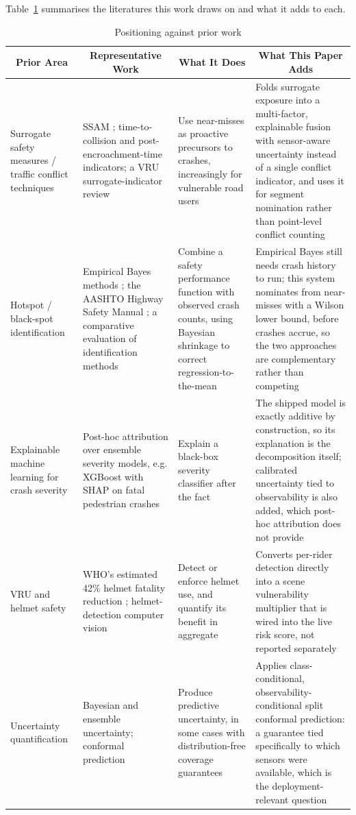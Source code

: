 \documentclass[journal]{IEEEtran}
\begin{document}
Table~\ref{tab:related} summarises the literatures this work draws on and what it adds to each.

\begin{table}[!t]
\centering
\caption{Positioning against prior work}
\label{tab:related}
\footnotesize
\setlength{\tabcolsep}{4pt}
\begin{tabular}{p{2.3cm}p{3.6cm}p{4.3cm}p{4.3cm}}
\toprule
\multicolumn{1}{c}{\textbf{Prior Area}} & \multicolumn{1}{c}{\textbf{Representative Work}} & \multicolumn{1}{c}{\textbf{What It Does}} & \multicolumn{1}{c}{\textbf{What This Paper Adds}} \\
\midrule
Surrogate safety measures / traffic conflict techniques & SSAM \cite{gettman2008}; time-to-collision and post-encroachment-time indicators; a VRU surrogate-indicator review \cite{johnsson2018} & Use near-misses as proactive precursors to crashes, increasingly for vulnerable road users & Folds surrogate exposure into a multi-factor, explainable fusion with sensor-aware uncertainty instead of a single conflict indicator, and uses it for segment nomination rather than point-level conflict counting \\
Hotspot / black-spot identification & Empirical Bayes methods \cite{hauer2002}; the AASHTO Highway Safety Manual \cite{aashto2010}; a comparative evaluation of identification methods \cite{cheng2005} & Combine a safety performance function with observed crash counts, using Bayesian shrinkage to correct regression-to-the-mean & Empirical Bayes still needs crash history to run; this system nominates from near-misses with a Wilson lower bound, before crashes accrue, so the two approaches are complementary rather than competing \\
Explainable machine learning for crash severity & Post-hoc attribution over ensemble severity models, e.g. XGBoost with SHAP on fatal pedestrian crashes \cite{chang2022} & Explain a black-box severity classifier after the fact & The shipped model is exactly additive by construction, so its explanation is the decomposition itself; calibrated uncertainty tied to observability is also added, which post-hoc attribution does not provide \\
VRU and helmet safety & WHO's estimated 42\% helmet fatality reduction \cite{who2006}; helmet-detection computer vision & Detect or enforce helmet use, and quantify its benefit in aggregate & Converts per-rider detection directly into a scene vulnerability multiplier that is wired into the live risk score, not reported separately \\
Uncertainty quantification & Bayesian and ensemble uncertainty; conformal prediction & Produce predictive uncertainty, in some cases with distribution-free coverage guarantees & Applies class-conditional, observability-conditional split conformal prediction: a guarantee tied specifically to which sensors were available, which is the deployment-relevant question \\
\bottomrule
\end{tabular}
\end{table}
\end{document}
